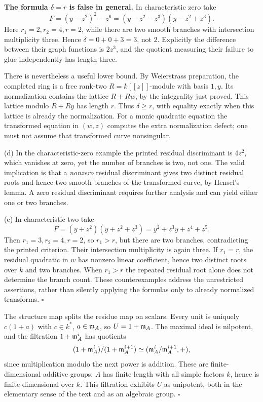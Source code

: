 \documentclass[11pt]{article}
\let\chapterexercise\exercise
\renewcommand{\exercise}[2]{\Needspace{8\baselineskip}\chapterexercise{#1}{#2}}
\begin{document}
\textbf{The formula $\delta=r$ is false in general.} In characteristic zero take
\[ F=(y-z^2)^2-z^6=(y-z^2-z^3)(y-z^2+z^3). \]
Here $r_1=2,r_2=4,r=2$, while there are two smooth branches with intersection multiplicity three. Hence $\delta=0+0+3=3$, not $2$. Explicitly the difference between their graph functions is $2z^3$, and the quotient measuring their failure to glue independently has length three.

There is nevertheless a useful lower bound. By Weierstrass preparation, the completed ring is a free rank-two $R=k[[z]]$-module with basis $1,y$. Its normalization contains the lattice $R+Rw$, by the integrality just proved. This lattice modulo $R+Ry$ has length $r$. Thus $\delta\ge r$, with equality exactly when this lattice is already the normalization. For a monic quadratic equation the transformed equation in $(w,z)$ computes the extra normalization defect; one must not assume that transformed curve nonsingular.

(d) In the characteristic-zero example the printed residual discriminant is $4z^2$, which vanishes at zero, yet the number of branches is two, not one. The valid implication is that a \emph{nonzero} residual discriminant gives two distinct residual roots and hence two smooth branches of the transformed curve, by Hensel's lemma. A zero residual discriminant requires further analysis and can yield either one or two branches.

(e) In characteristic two take
\[ F=(y+z^2)(y+z^2+z^3)=y^2+z^3y+z^4+z^5. \]
Then $r_1=3,r_2=4,r=2$, so $r_1>r$, but there are two branches, contradicting the printed criterion. Their intersection multiplicity is again three. If $r_1=r$, the residual quadratic in $w$ has nonzero linear coefficient, hence two distinct roots over $k$ and two branches. When $r_1>r$ the repeated residual root alone does not determine the branch count. These counterexamples address the unrestricted assertions, rather than silently applying the formulas only to already normalized transforms. \hfill$\square$

\pf
The structure map splits the residue map on scalars. Every unit is uniquely $c(1+a)$ with $c\in k^*$, $a\in\mathfrak m_A$, so $U=1+\mathfrak m_A$. The maximal ideal is nilpotent, and the filtration $1+\mathfrak m_A^i$ has quotients
\[ (1+\mathfrak m_A^i)/(1+\mathfrak m_A^{i+1})\simeq(\mathfrak m_A^i/\mathfrak m_A^{i+1},+), \]
since multiplication modulo the next power is addition. These are finite-dimensional additive groups: $A$ has finite length with all simple factors $k$, hence is finite-dimensional over $k$. This filtration exhibits $U$ as unipotent, both in the elementary sense of the text and as an algebraic group. \hfill$\square$
\end{document}
